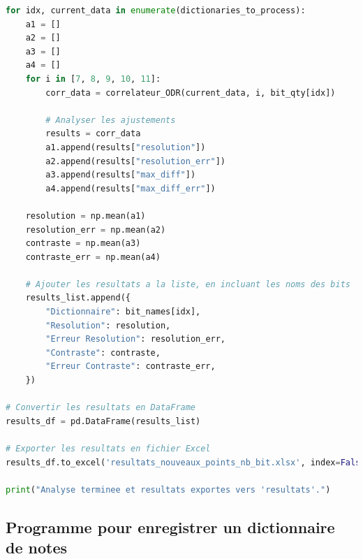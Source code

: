 \documentclass[11pt,letterpaper]{article}
\begin{document}
\begin{lstlisting}[language=python]
for idx, current_data in enumerate(dictionaries_to_process):
    a1 = []
    a2 = []
    a3 = []
    a4 = []
    for i in [7, 8, 9, 10, 11]:
        corr_data = correlateur_ODR(current_data, i, bit_qty[idx])

        # Analyser les ajustements
        results = corr_data
        a1.append(results["resolution"])
        a2.append(results["resolution_err"])
        a3.append(results["max_diff"])
        a4.append(results["max_diff_err"])

    resolution = np.mean(a1)
    resolution_err = np.mean(a2)
    contraste = np.mean(a3)
    contraste_err = np.mean(a4)

    # Ajouter les resultats a la liste, en incluant les noms des bits
    results_list.append({
        "Dictionnaire": bit_names[idx],
        "Resolution": resolution,
        "Erreur Resolution": resolution_err,
        "Contraste": contraste,
        "Erreur Contraste": contraste_err,
    })

# Convertir les resultats en DataFrame
results_df = pd.DataFrame(results_list)

# Exporter les resultats en fichier Excel
results_df.to_excel('resultats_nouveaux_points_nb_bit.xlsx', index=False)

print("Analyse terminee et resultats exportes vers 'resultats'.")
\end{lstlisting}

\subsection{Programme pour enregistrer un dictionnaire de notes}
\end{document}
